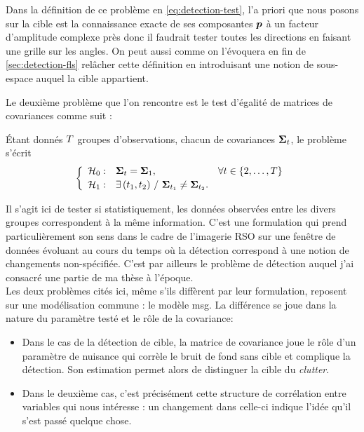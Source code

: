 \begin{remark}
  Dans la définition de ce problème en \cref{eq:detection-test}, l'a priori que nous posons sur la cible est la connaissance exacte de ses composantes $\boldsymbol{p}$ à un facteur d'amplitude complexe près donc il faudrait tester toutes les directions en faisant une grille sur les angles. On peut aussi comme on l'évoquera en fin de \cref{sec:detection-fls} relâcher cette définition en introduisant une notion de sous-espace auquel la cible appartient.
\end{remark}


Le deuxième problème que l'on rencontre est le test d'égalité de matrices de covariances comme suit :
\begin{definition}
\label{def:detection-archetype-egalite}
  Étant donnés $T$ groupes d'observations, chacun de covariances $\boldsymbol{\Sigma}_t$, le problème s'écrit
  \begin{equation}
    \left\{
    \begin{array}{lll}
      \hypothesis_0: & \MCov_\itime = \MCov_1, & \forall \itime\in\intrange{2}{\Ntime} \\[2pt]
      \hypothesis_1: & \exists\,(\itime_1,\itime_2)\ /\ \MCov_{\itime_1}\neq\MCov_{\itime_2}. &
    \end{array}
    \right.
    \label{eq:detection-test-egalite}
  \end{equation}
\end{definition}

Il s'agit ici de tester si statistiquement, les données observées entre les divers groupes correspondent à la même information. C'est une formulation qui prend particulièrement son sens dans le cadre de l'imagerie RSO sur une fenêtre de données évoluant au cours du temps où la détection correspond à une notion de changements non-spécifiée. C'est par ailleurs le problème de détection auquel j'ai consacré une partie de ma thèse   à l'époque.\\


Les deux problèmes cités ici, même s'ils diffèrent par leur formulation, reposent sur une modélisation commune : le modèle msg. La différence se joue dans la nature du paramètre testé et le rôle de la covariance:
\begin{itemize}
  \item Dans le cas de la détection de cible, la matrice de covariance joue le rôle d'un paramètre de nuisance qui corrèle le bruit de fond sans cible et complique la détection. Son estimation permet alors de distinguer la cible du \emph{clutter}.
  \item Dans le deuxième cas, c'est précisément cette structure de corrélation entre variables qui nous intéresse : un changement dans celle-ci indique l'idée qu'il s'est passé quelque chose.
\end{itemize}

